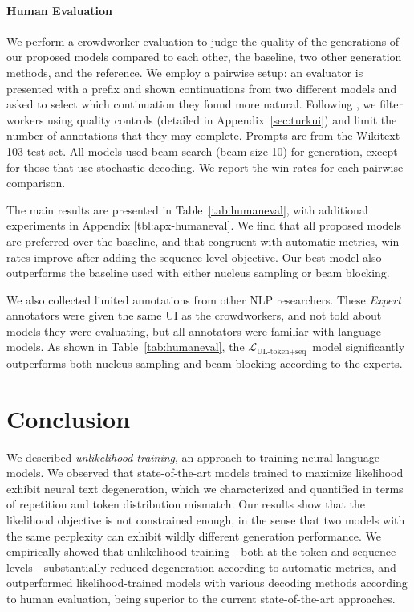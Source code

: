 \paragraph{Human Evaluation}
\label{ssec:human}
We perform a crowdworker evaluation to judge the quality of the generations of our proposed models compared to each other, the baseline, two other generation methods, and the reference. We employ a pairwise setup: an evaluator is presented with a prefix and shown continuations from two different models and asked to select which continuation they found more natural. Following \citet{li2019acute}, we filter workers using quality controls (detailed in Appendix~\ref{sec:turkui}) and limit the number of annotations that they may complete. Prompts are from the Wikitext-103 test set. All models used beam search (beam size 10) for generation, except for those that use stochastic decoding. We report the win rates for each pairwise comparison.

The main results are presented in Table~\ref{tab:humaneval}, with additional experiments in Appendix \autoref{tbl:apx-humaneval}. We find that all proposed models are preferred over the baseline, and that congruent with automatic metrics, win rates improve after adding the sequence level objective. Our best model also outperforms the baseline used with either nucleus sampling or beam blocking.

We also collected limited annotations from other NLP researchers. These {\em Expert} annotators were given the same UI as the crowdworkers, and not told about models they were evaluating, but all annotators were familiar with language models. As shown in Table~\ref{tab:humaneval}, the $\mathcal{L}_{\text{UL-token+seq}}$~model significantly outperforms both nucleus sampling and beam blocking according to the experts.

\section{Conclusion}
\label{sec:conclusion}

We described \textit{unlikelihood training}, an approach to training neural language models. We observed that state-of-the-art models trained to maximize likelihood exhibit neural text degeneration, which we characterized and quantified in terms of repetition and token distribution mismatch. Our results show that the likelihood objective is not constrained enough, in the sense that two models with the same perplexity can exhibit wildly different generation performance. We empirically showed that unlikelihood training - both at the token and sequence levels - substantially reduced degeneration according to automatic metrics, and outperformed likelihood-trained models with various decoding methods according to human evaluation,  being superior to the current state-of-the-art approaches.


